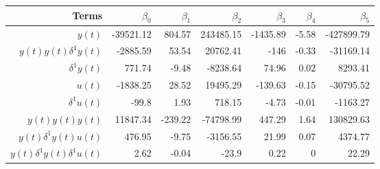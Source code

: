 \begin{tabular}{rrrrrrr}
Terms & $\beta_0$ & $\beta_1$ & $\beta_2$ & $\beta_3$ & $\beta_4$ & $\beta_5$ \\ 
\hline 
$y(t)$ & -39521.12 & 804.57 & 243485.15 & -1435.89 & -5.58 & -427899.79 \\ 
$y(t)y(t)\delta^1 y(t)$ & -2885.59 & 53.54 & 20762.41 & -146 & -0.33 & -31169.14 \\ 
$\delta^1 y(t)$ & 771.74 & -9.48 & -8238.64 & 74.96 & 0.02 & 8293.41 \\ 
$u(t)$ & -1838.25 & 28.52 & 19495.29 & -139.63 & -0.15 & -30795.52 \\ 
$\delta^1 u(t)$ & -99.8 & 1.93 & 718.15 & -4.73 & -0.01 & -1163.27 \\ 
$y(t)y(t)y(t)$ & 11847.34 & -239.22 & -74798.99 & 447.29 & 1.64 & 130829.63 \\ 
$y(t)\delta^1 y(t)u(t)$ & 476.95 & -9.75 & -3156.55 & 21.99 & 0.07 & 4374.77 \\ 
$y(t)\delta^1 y(t)\delta^1 u(t)$ & 2.62 & -0.04 & -23.9 & 0.22 & 0 & 22.29 \\ 
\hline 
\end{tabular}